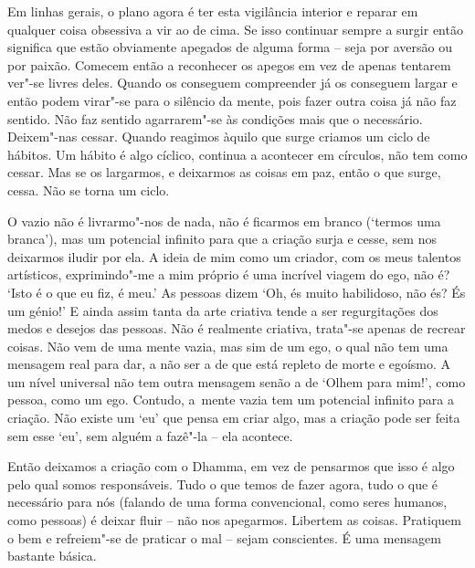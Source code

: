 Em linhas gerais, o plano agora é ter esta vigilância interior e reparar
em qualquer coisa obsessiva a vir ao de cima. Se isso continuar sempre a
surgir então significa que estão obviamente apegados de alguma forma --
seja por aversão ou por paixão. Comecem então a reconhecer os apegos em
vez de apenas tentarem ver"-se livres deles. Quando os conseguem
compreender já os conseguem largar e então podem virar"-se para o
silêncio da mente, pois fazer outra coisa já não faz sentido. Não faz
sentido agarrarem"-se às condições mais que o necessário. Deixem"-nas
cessar. Quando reagimos àquilo que surge criamos um ciclo de hábitos. Um
hábito é algo cíclico, continua a acontecer em círculos, não tem como
cessar. Mas se os largarmos, e deixarmos as coisas em paz, então o que
surge, cessa. Não se torna um ciclo.

O vazio não é livrarmo"-nos de nada, não é ficarmos em branco (`termos
uma branca'), mas um potencial infinito para que a criação surja e
cesse, sem nos deixarmos iludir por ela. A ideia de mim como um criador,
com os meus talentos artísticos, exprimindo"-me a mim próprio é uma
incrível viagem do ego, não é? `Isto é o que eu fiz, é meu.' As pessoas
dizem `Oh, és muito habilidoso, não és? És um génio!' E ainda assim
tanta da arte criativa tende a ser regurgitações dos medos e desejos das
pessoas. Não é realmente criativa, trata"-se apenas de recrear coisas.
Não vem de uma mente vazia, mas sim de um ego, o qual não tem uma
mensagem real para dar, a não ser a de que está repleto de morte e
egoísmo. A um nível universal não tem outra mensagem senão a de `Olhem
para mim!', como pessoa, como um ego. Contudo, a~mente vazia tem um
potencial infinito para a criação. Não existe um `eu' que pensa em criar
algo, mas a criação pode ser feita sem esse `eu', sem alguém a fazê"-la
-- ela acontece.

Então deixamos a criação com o Dhamma, em vez de pensarmos que isso é
algo pelo qual somos responsáveis. Tudo o que temos de fazer agora, tudo
o que é necessário para nós (falando de uma forma convencional, como
seres humanos, como pessoas) é deixar fluir -- não nos apegarmos.
Libertem as coisas. Pratiquem o bem e refreiem"-se de praticar o mal --
sejam conscientes. É uma mensagem bastante básica.

